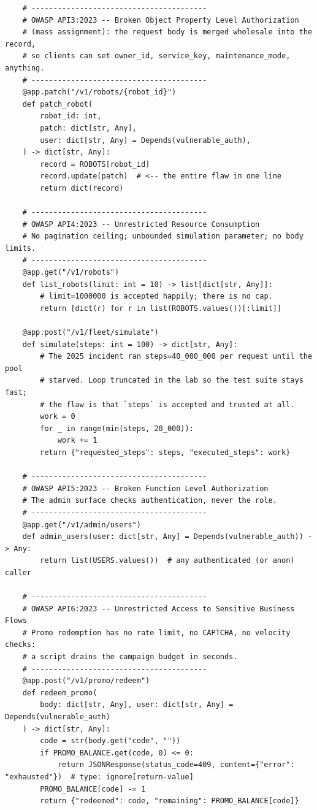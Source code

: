 \begin{verbatim}
    # ----------------------------------------
    # OWASP API3:2023 -- Broken Object Property Level Authorization
    # (mass assignment): the request body is merged wholesale into the record,
    # so clients can set owner_id, service_key, maintenance_mode, anything.
    # ----------------------------------------
    @app.patch("/v1/robots/{robot_id}")
    def patch_robot(
        robot_id: int,
        patch: dict[str, Any],
        user: dict[str, Any] = Depends(vulnerable_auth),
    ) -> dict[str, Any]:
        record = ROBOTS[robot_id]
        record.update(patch)  # <-- the entire flaw in one line
        return dict(record)

    # ----------------------------------------
    # OWASP API4:2023 -- Unrestricted Resource Consumption
    # No pagination ceiling; unbounded simulation parameter; no body limits.
    # ----------------------------------------
    @app.get("/v1/robots")
    def list_robots(limit: int = 10) -> list[dict[str, Any]]:
        # limit=1000000 is accepted happily; there is no cap.
        return [dict(r) for r in list(ROBOTS.values())[:limit]]

    @app.post("/v1/fleet/simulate")
    def simulate(steps: int = 100) -> dict[str, Any]:
        # The 2025 incident ran steps=40_000_000 per request until the pool
        # starved. Loop truncated in the lab so the test suite stays fast;
        # the flaw is that `steps` is accepted and trusted at all.
        work = 0
        for _ in range(min(steps, 20_000)):
            work += 1
        return {"requested_steps": steps, "executed_steps": work}

    # ----------------------------------------
    # OWASP API5:2023 -- Broken Function Level Authorization
    # The admin surface checks authentication, never the role.
    # ----------------------------------------
    @app.get("/v1/admin/users")
    def admin_users(user: dict[str, Any] = Depends(vulnerable_auth)) -> Any:
        return list(USERS.values())  # any authenticated (or anon) caller

    # ----------------------------------------
    # OWASP API6:2023 -- Unrestricted Access to Sensitive Business Flows
    # Promo redemption has no rate limit, no CAPTCHA, no velocity checks:
    # a script drains the campaign budget in seconds.
    # ----------------------------------------
    @app.post("/v1/promo/redeem")
    def redeem_promo(
        body: dict[str, Any], user: dict[str, Any] = Depends(vulnerable_auth)
    ) -> dict[str, Any]:
        code = str(body.get("code", ""))
        if PROMO_BALANCE.get(code, 0) <= 0:
            return JSONResponse(status_code=409, content={"error": "exhausted"})  # type: ignore[return-value]
        PROMO_BALANCE[code] -= 1
        return {"redeemed": code, "remaining": PROMO_BALANCE[code]}


\end{verbatim}
